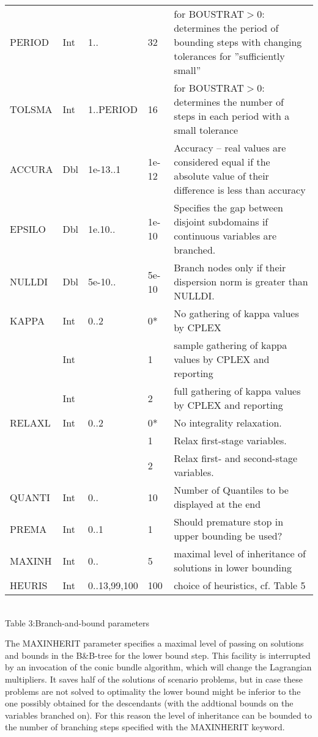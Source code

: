 \documentclass[11pt,draft]{article}
\newcommand{\+}{{\ti{+}}}
\newcommand{\1}{{\ti{1}}}
\begin{document}
\begin{center}
\begin{supertabular}{|llllp{6.2cm}|}
PERIOD&Int&1..&32&for BOUSTRAT$>$0: determines the period of bounding steps with changing tolerances for ''sufficiently small''\\
TOLSMA&Int&1..{\footnotesize PERIOD}&16&for BOUSTRAT$>$0: determines the number of steps in each period with a small tolerance\\[0.2em]
ACCURA&Dbl&1e-13..1&1e-12& Accuracy -- real values are considered equal if the absolute value of their difference is less than accuracy\\[0.2em]
EPSILO&Dbl&1e.10..&1e-10&Specifies the gap between disjoint subdomains if continuous variables are branched.\\[0.2em]
NULLDI&Dbl&5e-10..&5e-10&Branch nodes only if their dispersion norm is greater than NULLDI.\\[0.2em]
KAPPA&Int&0..2&0*&No gathering of kappa values by CPLEX\\
&Int&&1&sample gathering of kappa values by CPLEX and reporting\\
&Int&&2&full gathering of kappa values by CPLEX and reporting\\[0.2em]
RELAXL&Int&0..2&0*&No integrality relaxation.\\
&&&1&Relax first-stage variables.\\
&&&2&Relax first- and second-stage variables.\\[0.2em]
QUANTI&Int&0..&10&Number of Quantiles to be displayed at the end\\[0.2em]
PREMA&Int&0..1&1&Should premature stop in upper bounding be used?\\[0.2em]
MAXINH&Int&0..&5&maximal level of inheritance of solutions in lower bounding\\[0.2em]
HEURIS&Int&0..13,99,100&100&choice of heuristics, cf. Table 5\\[0.2em]
\hline
\end{supertabular}\\[0.5em]
{Table 3:\quad Branch-and-bound parameters}
\end{center}

The MAXINHERIT parameter specifies a maximal level of passing on solutions and bounds in the B\&B-tree
for the lower bound step.
This facility is interrupted by an invocation of the conic bundle algorithm, which will change the
Lagrangian multipliers. It saves half of the solutions of scenario problems, but in case these problems
are not solved to optimality the lower bound might be inferior to the one possibly obtained for the descendants
(with the addtional bounds on the variables branched on).
For this reason the level of inheritance can be bounded to the number
of branching steps specified with the \mbox{MAXINHERIT} keyword.
\end{document}
